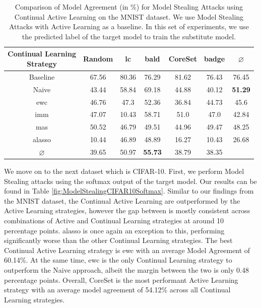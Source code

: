 \begin{table}[h]
    \centering
    \begin{tabular}{c | c c c c c | c} 
        \hline
        \diagbox[width=11em]{Active \\ Learning Strategy}{Continual Learning \\ Strategy} & Random & \gls{lc} & \gls{bald} & CoreSet & \gls{badge} & $\varnothing$ \\ 
        \hline 
        Baseline & 67.56 & 80.36 & 76.29 & 81.62 & 76.43 & 76.45\\
        \hline
        Naive & 43.44 & 58.84 & 69.18 & 44.88 & 40.12 & \textbf{51.29}\\
        \gls{ewc} &  46.76 & 47.3 & 52.36 & 36.84 & 44.73 & 45.6\\
        \gls{imm} & 47.07 & 10.43 & 58.71 & 51.0 & 47.0 & 42.84\\
        \gls{mas} & 50.52 & 46.79 & 49.51 & 44.96 & 49.47 & 48.25\\
        \gls{alasso} &  10.44 & 46.89 & 48.89 & 16.27 & 10.43 & 26.68\\
        \hline
        $\varnothing$ & 39.65 & 50.97 & \textbf{55.73} & 38.79 & 38.35\\
        \hline
    \end{tabular}
    \caption[Model agreement of Continual Learning strategies on MNIST using the predicted class label]{Comparison of Model Agreement (in \%) for Model Stealing Attacks using Continual Active Learning on the MNIST dataset. We use Model Stealing Attacks with Active Learning as a baseline.
    In this set of experiments, we use the predicted label of the target model to train the substitute model.}
    \label{fig:ModelStealingMNISTLabel}
\end{table}

We move on to the next dataset which is CIFAR-10. First, we perform Model Stealing attacks using the softmax output of the target model. Our results can be found in Table \ref{fig:ModelStealingCIFAR10Softmax}. Similar to our findings from the MNIST dataset, the Continual Active Learning
are outperformed by the Active Learning strategies, however the gap between is mostly consistent across combinations of Active and Continual Learning strategies at around 10 percentage points. \gls{alasso} is once again an exception to this, performing significantly worse than the other
Continual Learning strategies. The best Continual Active Learning strategy is \gls{ewc} with an average Model Agreement of 60.14\%. At the same time, \gls{ewc} is the only Continual Learning strategy to outperform the Naive approach, albeit the margin between the two is only 0.48 percentage points.
Overall, CoreSet is the most performant Active Learning strategy with an average model agreement of 54.12\% across all Continual Learning strategies. \par

